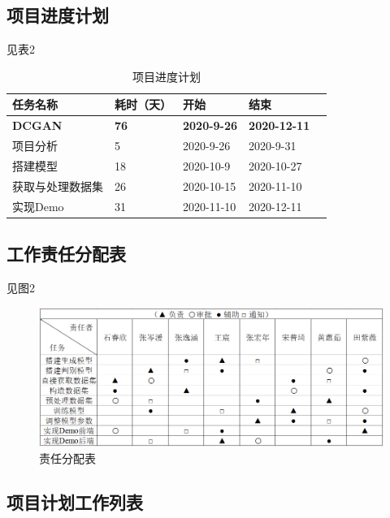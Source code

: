\documentclass[
  hyperref, a4paper]{ctexart}
\begin{document}
\hypertarget{ux9879ux76eeux8fdbux5ea6ux8ba1ux5212}{%
\subsection{项目进度计划}\label{ux9879ux76eeux8fdbux5ea6ux8ba1ux5212}}

见表2

\begin{table}
    \caption{项目进度计划}
    \centering
    \begin{tabular}{|p{2.0cm}<{\centering}|p{1.0cm}<{\centering}|p{2.0cm}<{\centering}|p{2.0cm}<{\centering}|p{2.0cm}<{\centering}|}
    \hline
    任务名称     & 耗时（天） & 开始         & 结束         \\ \hline
    \textbf{DCGAN}    & \textbf{76}    & \textbf{2020-9-26}  & \textbf{2020-12-11} \\ \hline
    项目分析     & 5     & 2020-9-26  & 2020-9-31  \\ \hline
    搭建模型     & 18     & 2020-10-9  & 2020-10-27 \\ \hline
    获取与处理数据集 & 26     & 2020-10-15 & 2020-11-10 \\ \hline
    实现Demo   & 31    & 2020-11-10 & 2020-12-11 \\ \hline
    \end{tabular}
\end{table}

\hypertarget{ux5de5ux4f5cux8d23ux4efbux5206ux914dux8868}{%
\subsection{工作责任分配表}\label{ux5de5ux4f5cux8d23ux4efbux5206ux914dux8868}}

见图2

\begin{figure}
\centering
\includegraphics{1.png}
\caption{责任分配表}
\end{figure}

\hypertarget{ux9879ux76eeux8ba1ux5212ux5de5ux4f5cux5217ux8868}{%
\subsection{项目计划工作列表}\label{ux9879ux76eeux8ba1ux5212ux5de5ux4f5cux5217ux8868}}
\end{document}
